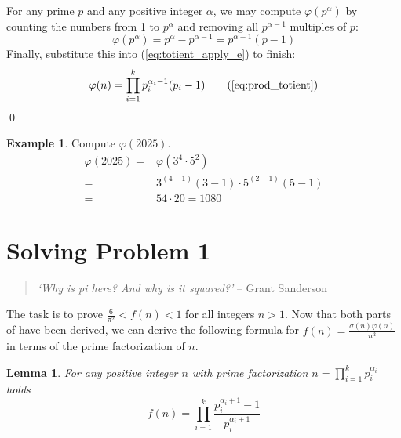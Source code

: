 \documentclass[a4paper, 12pt]{article}
\newtheorem{lemma}{Lemma}
\theoremstyle{definition}
\newtheorem{example}{Example}
\begin{document}
For any prime $p$ and any positive integer $\alpha$,
we may compute $\varphi(p^\alpha)$ by
counting the numbers from 1 to $p^\alpha$ and
removing all $p^{\alpha-1}$ multiples of $p$:
\begin{equation}
  \varphi(p^\alpha)=p^\alpha - p^{\alpha-1} = p^{\alpha-1}(p-1)
\end{equation}
Finally, substitute this into (\ref{eq:totient_apply_e}) to finish:
\[
  \varphi(n) = \prod_{i=1}^{k} p_i^{\alpha_i-1}(p_i-1) \tag{\ref{eq:prod_totient}}
\]
\qed\vspace{1em}

\begin{example}\label{ex:phi_2025}
  Compute $\varphi(2025)$.
  \begin{align*}
    \varphi(2025) = &\varphi(3^4\cdot 5^2)\\
    = &3^(4-1)(3-1) \cdot 5^(2-1)(5-1)\\
    = &54 \cdot 20 = 1080
  \end{align*}
\end{example}

\section{Solving Problem 1}
\begin{quote}
  \textit{`Why is pi here? And why is it squared?'}
  \hfill -- Grant Sanderson
  \end{quote}

The task is to prove $\frac{6}{\pi^2}<f(n)<1$ for all integers $n>1$.
Now that both parts of  have been derived,
we can derive the following formula for $f(n) = \frac{\sigma(n)\varphi(n)}{n^2}$ in terms of the prime factorization of $n$.

\vspace{1em}\begin{lemma}\label{lemma:f_prod_form}
  For any positive integer $n$ with prime factorization $n=\prod_{i=1}^{k}p_i^{\alpha_i}$ holds
  \begin{equation}\label{eq:f_prod_form}
    f(n)=\prod_{i=1}^{k} \frac{p_i^{\alpha_i+1}-1}{p_i^{\alpha_i+1}}
  \end{equation}
\end{lemma}\vspace{1em}
\end{document}
